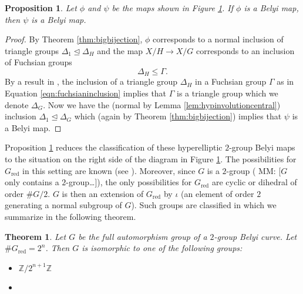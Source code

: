 \documentclass{dcthesis}
\newcommand{\ZZ}{\mathbb Z}
\newcommand{\mm}[1]{{\color{blue} \sf MM: [#1]}}
\DeclareMathOperator{\rred}{red}
\numberwithin{equation}{section}
\newtheorem{theorem}[equation]{Theorem}
\newtheorem{prop}[equation]{Proposition}
\theoremstyle{definition}
\theoremstyle{remark}
\begin{document}
{{\begin{figure}[ht]
      \label{fig:hyperellipticbelyi}
    \end{figure}
    \begin{prop}\label{prop:liftbelyi}
      Let $\phi$ and $\psi$ be the maps shown in
      Figure \ref{fig:hyperellipticbelyi}.
      If $\phi$ is a Belyi map,
      then $\psi$ is a Belyi map.
    \end{prop}
    \begin{proof}
      By Theorem \ref{thm:bigbijection},
      $\phi$ corresponds to
      a normal inclusion of triangle groups
      $
        \Delta_1\trianglelefteq\Delta_H
      $
      and the map $X / H \to X / G$
      corresponds to an inclusion of Fuchsian groups
      \begin{equation}\label{eqn:fuchsianinclusion}
        \Delta_H\leq\Gamma.
      \end{equation}
      By a result in \cite[Page 36]{singerman},
      the inclusion of a triangle group $\Delta_H$ in
      a Fuchsian group $\Gamma$
      as in Equation \ref{eqn:fuchsianinclusion}
      implies that $\Gamma$ is a triangle group
      which we denote $\Delta_G$.
      Now we have the
      (normal by Lemma \ref{lem:hypinvolutioncentral})
      inclusion
      $\Delta_1\trianglelefteq\Delta_G$
      which (again by Theorem \ref{thm:bigbijection})
      implies that $\psi$ is a Belyi map.
    \end{proof}
    Proposition \ref{prop:liftbelyi}
    reduces the classification of these hyperelliptic $2$-group Belyi maps
    to the situation on the right side of the diagram in
    Figure \ref{fig:hyperellipticbelyi}.
    The possibilities for $G_{\rred}$
    in this setting are known
    (see \cite[\S 1.1]{dolgachev}).
    Moreover, since $G$ is a
    $2$-group (\mm{$G$ only contains a $2$-group\ldots}),
    the only possibilities for $G_{\rred}$
    are cyclic or dihedral of order $\#G / 2$.
    $G$ is then an extension of $G_{\rred}$
    by $\iota$
    (an element of order $2$ generating a normal subgroup of $G$).
    Such groups are classified in
    \cite{hyperelliptic} which we summarize in the
    following theorem.
    \begin{theorem}
      \label{thm:hyperelliptic}
      Let $G$ be the full automorphism group of a
      $2$-group Belyi curve.
      Let $\#G_{\rred} = 2^n$.
      Then $G$ is isomorphic to one of the following groups:
      \begin{itemize}
        \item
          $\ZZ/2^{n+1}\ZZ$
        \item

\end{itemize}
\end{theorem}}}
\end{document}
